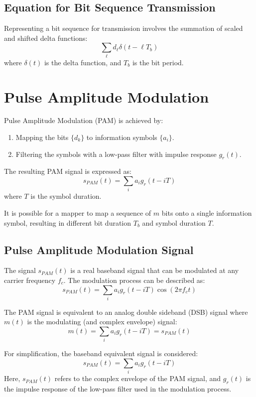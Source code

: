 \subsection*{Equation for Bit Sequence Transmission}
Representing a bit sequence for transmission involves the summation of scaled and shifted delta functions:
\[
\sum_{\ell} d_{\ell}\delta(t - \ell T_b)
\]
where \( \delta(t) \) is the delta function, and \( T_b \) is the bit period.


\section*{Pulse Amplitude Modulation}

Pulse Amplitude Modulation (PAM) is achieved by:
\begin{enumerate}
    \item Mapping the bits \( \{d_k\} \) to information symbols \( \{a_i\} \).
    \item Filtering the symbols with a low-pass filter with impulse response \( g_r(t) \).
\end{enumerate}
The resulting PAM signal is expressed as:
\[ s_{PAM}(t) = \sum_i a_i g_r(t - iT) \]
where \( T \) is the symbol duration.

It is possible for a mapper to map a sequence of \( m \) bits onto a single information symbol, resulting in different bit duration \( T_b \) and symbol duration \( T \).

\subsection*{Pulse Amplitude Modulation Signal}

The signal \( s_{PAM}(t) \) is a real baseband signal that can be modulated at any carrier frequency \( f_c \). The modulation process can be described as:
\[ s_{PAM}(t) = \sum_i a_i g_r(t - iT) \cos(2\pi f_c t) \]

The PAM signal is equivalent to an analog double sideband (DSB) signal where \( m(t) \) is the modulating (and complex envelope) signal:
\[ m(t) = \sum_i a_i g_r(t - iT) = s_{PAM}(t) \]

For simplification, the baseband equivalent signal is considered:
\[ s_{PAM}(t) = \sum_i a_i g_r(t - iT) \]
Here, \( s_{PAM}(t) \) refers to the complex envelope of the PAM signal, and \( g_r(t) \) is the impulse response of the low-pass filter used in the modulation process.

